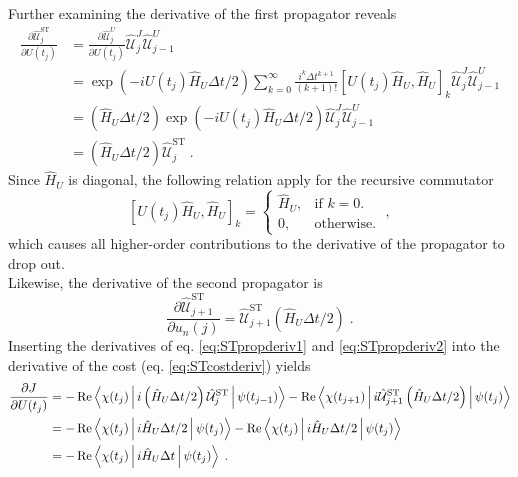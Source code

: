 Further examining the derivative of the first propagator reveals
\begin{align}
	\frac{\partial \hat{\mathcal{U}}_{j}^{\mathrm{ST}}}{\partial U (t_j)} &=  \frac{\partial \hat{\mathcal{U}}_{j}^{U}}{\partial U (t_j)} \hat{\mathcal{U}}_{j}^{J} \hat{\mathcal{U}}_{j-1}^{U} \nonumber \\
	&=  \exp \left( -i U (t_j) \hat{H}_U  \Delta t /2 \right)  \sum_{k = 0}^{\infty }  \frac{i^k \Delta t^{k+1}}{(k+1)!} \left[ U (t_j) \hat{H}_U  ,  \hat{H}_U \right]_k \hat{\mathcal{U}}_{j}^{J} \hat{\mathcal{U}}_{j-1}^{U} \nonumber \\
	&= \left(  \hat{H}_U \Delta t /2 \right) \exp \left( -i U(t_j) \hat{H}_U  \Delta t /2 \right)   \hat{\mathcal{U}}_{j}^{J} \hat{\mathcal{U}}_{j-1}^{U} \nonumber \\
	&= \left(  \hat{H}_U \Delta t /2 \right) \hat{\mathcal{U}}_{j}^{\mathrm{ST}} \; . \label{eq:STpropderiv1}
\end{align}
Since $\hat{H}_U$ is diagonal, the following relation apply for the recursive commutator 
\begin{equation}
	\left[ U (t_j) \hat{H}_U  ,  \hat{H}_U \right]_k =  
	\begin{cases}
    	\hat{H}_U, & \text{if $k = 0$}.\\
    	0, & \text{otherwise}.
  	\end{cases} \; ,
\end{equation}  
which causes all higher-order contributions to the derivative of the propagator to drop out.\\
Likewise, the derivative of the second propagator is
\begin{equation}
	\frac{\partial \hat{\mathcal{U}}_{j+1}^{\mathrm{ST}}}{\partial u_n (j)} =  \hat{\mathcal{U}}_{j+1}^{\mathrm{ST}} \left(  \hat{H}_U \Delta t /2 \right) \; . \label{eq:STpropderiv2}
\end{equation}
Inserting the derivatives of eq. \eqref{eq:STpropderiv1} and \eqref{eq:STpropderiv2} into the derivative of the cost (eq. \eqref{eq:STcostderiv}) yields
\begin{align}
	\frac{\partial J}{\partial U (t_j)} &= - \Re \Braket{\chi (t_j) | i  \left(  \hat{H}_U \Delta t /2 \right) \hat{\mathcal{U}}_{j}^{\mathrm{ST}} | \psi (t_{j-1})} - \Re \Braket{\chi (t_{j+1}) | i \hat{\mathcal{U}}_{j+1}^{\mathrm{ST}} \left(  \hat{H}_U \Delta t /2 \right) | \psi (t_{j})} \nonumber \\
	&= - \Re \Braket{\chi (t_j) | i    \hat{H}_U \Delta t /2  | \psi (t_{j})} - \Re \Braket{\chi (t_{j}) | i    \hat{H}_U \Delta t /2   | \psi (t_{j})} \nonumber \\
	&= - \Re \Braket{\chi (t_j) | i \hat{H}_U \Delta t | \psi (t_{j})} \; . \label{eq:STcostgrad}
\end{align}  
